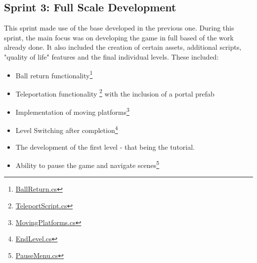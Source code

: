 \subsection{Sprint 3: Full Scale Development}
This sprint made use of the base developed in the previous one. During this sprint, the main focus was on developing the game in full based of the work already done. It also included the creation of certain assets, additional scripts, "quality of life" features and the final individual levels. These included:
\begin{itemize}
\item Ball return functionality\footnote{\href{https://github.com/Josh-SCG/Spherical_Shadows/blob/main/Assets/Scripts/BallReturn.cs}{BallReturn.cs}}

\item Teleportation functionality \footnote{\href{https://github.com/Josh-SCG/Spherical_Shadows/blob/main/Assets/Scripts/TeleportScript.cs}{TeleportScript.cs}} with the inclusion of a portal prefab

\item Implementation of moving platforms\footnote{\href{https://github.com/Josh-SCG/Spherical_Shadows/blob/main/Assets/Scripts/MovingPlatforms.cs}{MovingPlatforms.cs}}

\item Level Switching after completion\footnote{\href{https://github.com/Josh-SCG/Spherical_Shadows/blob/main/Assets/Scripts/EndLevel.cs}{EndLevel.cs}}

\item The development of the first level - that being the tutorial.

\item Ability to pause the game and navigate scenes\footnote{\href{https://github.com/Josh-SCG/Spherical_Shadows/blob/main/Assets/Scripts/PauseMenu.cs}{PauseMenu.cs}}
\end{itemize}

